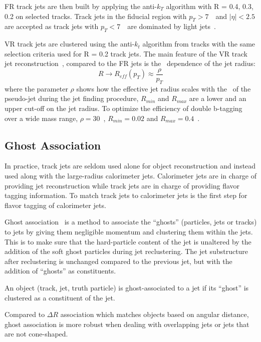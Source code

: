 \par FR track jets are then built by applying the anti-$k_T$ algorithm with R = {0.4, 0.3, 0.2} on selected tracks. Track jets in the fiducial region with $p_T > 7$~\GeV~and $|\eta| < 2.5$ are accepted as track jets with $p_T < 7$~\GeV~are dominated by light jets~\cite{ATL-PHYS-PUB-2014-013}. 				
\par VR track jets are clustered using the anti-$k_t$ algorithm from tracks with the same selection criteria used for R = 0.2 track jets. The main feature of the VR track jet reconstruction~\cite{Krohn:2009zg}, compared to the FR jets is the \pt~dependence of the jet radius:
\begin{equation}
R \rightarrow R_{eff}(p_T) \approx \frac{\rho}{p_T}
\end{equation}
where the parameter $\rho$ shows how the effective jet radius scales with the \pt~of the pseudo-jet during the jet finding procedure, $R_{min}$ and $R_{max}$ are a lower and an upper cut-off on the jet radius.
To optimize the efficiency of double b-tagging over a wide mass range, $\rho = 30$~\GeV, $R_{min} = 0.02$ and $R_{max} = 0.4$~\cite{ATL-PHYS-PUB-2017-010}.

\subsection{Ghost Association}
\label{sec:ga}

\par In practice, track jets are seldom used alone for object reconstruction and instead used along with the large-radius calorimeter jets. Calorimeter jets are in charge of providing jet reconstruction while track jets are in charge of providing flavor tagging information. To match track jets to calorimeter jets is the first step for flavor tagging of calorimeter jets. 
\par Ghost association~\cite{Cacciari:2007fd,Cacciari:2008gn} is a method to associate the ``ghosts'' (particles, jets or tracks) to jets by giving them negligible momentum and clustering them within the jets. This is to make sure that the hard-particle content of the jet is unaltered by the addition of the soft ghost particles during jet reclustering. The jet substructure after reclustering is unchanged compared to the previous jet, but with the addition of ``ghosts'' as constituents.
\par An object (track, jet, truth particle) is ghost-associated to a jet if its ``ghost'' is clustered as a constituent of the jet.
\par Compared to $\Delta R$ association which matches objects based on angular distance, ghost association is more robust when dealing with overlapping jets or jets that are not cone-shaped.

